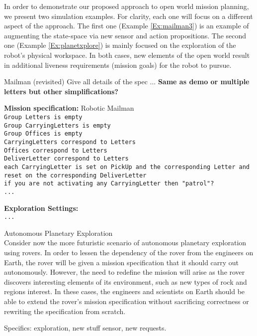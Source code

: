 In order to demonstrate our proposed approach to open world mission planning, we present two simulation examples. For clarity, each one will focus on a different aspect of the approach. The first one (Example \ref{Ex:mailman3}) is an example of augmenting the state-space via new sensor and action propositions. The second one (Example \ref{Ex:planetxplore}) is mainly focused on the exploration of the robot's physical workspace. In both cases, new elements of the open world result in additional liveness requirements (mission goals) for the robot to pursue.

\begin{myExample}\label{Ex:mailman3} Mailman (revisited)
	Give all details of the spec ... \textbf{Same as demo or multiple letters but other simplifications?}
\end{myExample}

\begin{algorithm}
	\textbf{Mission specification:} Robotic Mailman\\
	{\small
	\texttt{Group Letters is empty}\\
	\texttt{Group CarryingLetters is empty}\\
	\texttt{Group Offices is empty}\\
	
	\texttt{CarryingLetters correspond to Letters}\\
	\texttt{Offices correspond to Letters}\\
	\texttt{DeliverLetter correspond to Letters}\\
	
	\texttt{each CarryingLetter is set on PickUp and the corresponding Letter and reset on the corresponding DeliverLetter}\\
	
	\texttt{if you are not activating any CarryingLetter then "patrol"?}\\
	\texttt{...}\\
	}
	
	\textbf{Exploration Settings:}\\
	{\small
	\texttt{...} 
	}
\end{algorithm}

\begin{myExample}\label{Ex:planetxplore} Autonomous Planetary Exploration\\
	Consider now the more futuristic scenario of autonomous planetary exploration using rovers. In order to lessen the dependency of the rover from the engineers on Earth, the rover will be given a mission specification that it should carry out autonomously. However, the need to redefine the mission will arise as the rover discovers interesting elements of its environment, such as new types of rock and regions interest. In these cases, the engineers and scientists on Earth should be able to extend the rover's mission specification without sacrificing correctness or rewriting the specification from scratch.
	
	Specifics: exploration, new stuff sensor, new requests.
\end{myExample}

